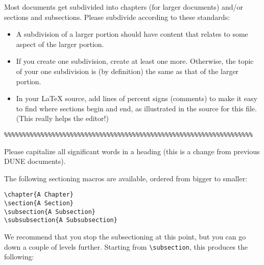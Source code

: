 Most documents get subdivided into chapters (for larger documents) and/or sections and subsections. Please subdivide according to these standards:

\begin{itemize}
\item A subdivision of a larger portion should have content that relates to some aspect of the larger portion. 
\item  If you create one subdivision, create at least one more. Otherwise, the topic of your one subdivision is (by definition) the same as that of the larger portion.
\item In your \LaTeX{} source, add lines of percent signs (comments) to make it easy to find where sections begin and end, as illustrated in the source for this file. (This really helps the editor!)
\end{itemize}

\begin{verbatim}
%%%%%%%%%%%%%%%%%%%%%%%%%%%%%%%%%%%%%%%%%%%%%%%%%%%%%%%%%%%%%%%%%%%%
\end{verbatim}

Please capitalize all significant words in a heading (this is a change from 
previous DUNE documents).

The following sectioning macros are available, ordered from bigger to smaller:

\begin{verbatim}
\chapter{A Chapter}
\section{A Section}
\subsection{A Subsection}
\subsubsection{A Subsubsection}
\end{verbatim}

We recommend that you stop the subsectioning at this point, but you can go down a couple of levels further.
Starting from \verb|\subsection|, this produces the following:

